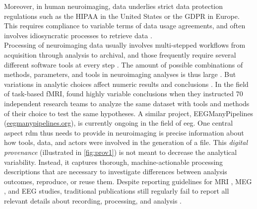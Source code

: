 Moreover, in human neuroimaging, data underlies strict data protection regulations such as the \gls{HIPAA} in the United States or the \gls{GDPR} in Europe.
This requires compliance to variable terms of data usage agreements, and often involves idiosyncratic processes to retrieve data \citep{waitedata}.\\
Processing of neuroimaging data usually involves multi-stepped workflows from acquisition through analysis to archival, and those frequently require several different software tools at every step \citep{poline2011, NISO2022119623}.
The amount of possible combinations of methods, parameters, and tools in neuroimaging analyses is thus large \citep{bowring2019exploring}.
But variations in analytic choices affect numeric results and conclusions \citep{silberzahn2018}.
In the field of task-based fMRI, \citet{botvinik2020variability} found highly variable conclusions when they instructed 70 independent research teams to analyze the same dataset with tools and methods of their choice to test the same hypotheses.
A similar project, EEGManyPipelines (\href{https://eegmanypipelines.org/}{eegmanypipelines.org}), is currently ongoing in the field of \gls{eeg}.
One central aspect \gls{rdm} thus needs to provide in neuroimaging is precise information about how tools, data, and actors were involved in the generation of a file.
This \textit{digital provenance}  (illustrated in \cref{fig:prov1}) is not meant to decrease the analytical variability.
Instead, it captures thorough, machine-actionable processing descriptions that are necessary to investigate differences between analysis outcomes, reproduce, or reuse them.
Despite reporting guidelines for MRI \citep{nichols2017best}, MEG \citep{pernet2020issues}, and EEG \citep{styles2021towards} studies, traditional publications still regularly fail to report all relevant details about recording, processing, and analysis  \citep[see, e.g.,][]{vsovskic2022better}.

